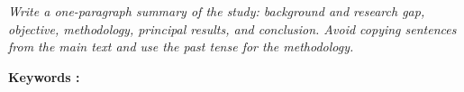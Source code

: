 %
\begin{abstracteng}

\textit{Write a one-paragraph summary of the study: background and research
gap, objective, methodology, principal results, and conclusion. Avoid
copying sentences from the main text and use the past tense for the
methodology.}

\bigskip
\noindent
\textbf{Keywords :} \keywordeng
\end{abstracteng}
